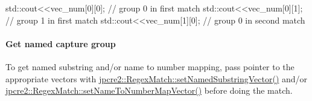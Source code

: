 \begin{DoxyCode}
std::cout<<vec\_num[0][0]; \textcolor{comment}{// group 0 in first match}
std::cout<<vec\_num[0][1]; \textcolor{comment}{// group 1 in first match}
std::cout<<vec\_num[1][0]; \textcolor{comment}{// group 0 in second match}
\end{DoxyCode}
 \hypertarget{index_get-named-capture-group}{}\paragraph{Get named capture group}\label{index_get-named-capture-group}
To get named substring and/or name to number mapping, pass pointer to the appropriate vectors with {\ttfamily \hyperlink{classjpcre2_1_1RegexMatch_ae495431f57cae54363331237ab21b56c}{jpcre2\+::\+Regex\+Match\+::set\+Named\+Substring\+Vector()}} and/or {\ttfamily \hyperlink{classjpcre2_1_1RegexMatch_a04926e61d8b5f1d8bdf344efecd567d8}{jpcre2\+::\+Regex\+Match\+::set\+Name\+To\+Number\+Map\+Vector()}} before doing the match.


